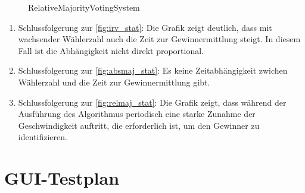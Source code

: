\documentclass[parskip=full]{scrartcl}
\begin{document}
\begin{figure}[ht]
	\caption{\label{fig:relmaj_stat}
		RelativeMajorityVotingSystem
	}
\end{figure}

\begin{enumerate}
	\item Schlussfolgerung zur \autoref{fig:irv_stat}: Die Grafik zeigt deutlich, dass mit wachsender Wählerzahl auch die Zeit zur Gewinnermittlung steigt. In diesem Fall ist die Abhängigkeit nicht direkt proportional.
	
	\item Schlussfolgerung zur \autoref{fig:absmaj_stat}: Es keine Zeitabhängigkeit zwichen Wählerzahl und die Zeit zur Gewinnermittlung gibt.
	
	\item Schlussfolgerung zur \autoref{fig:relmaj_stat}: Die Grafik zeigt, dass während der Ausführung des Algorithmus periodisch eine starke Zunahme der Geschwindigkeit auftritt, die erforderlich ist, um den Gewinner zu identifizieren.
\end{enumerate}

\section{GUI-Testplan}
\end{document}
